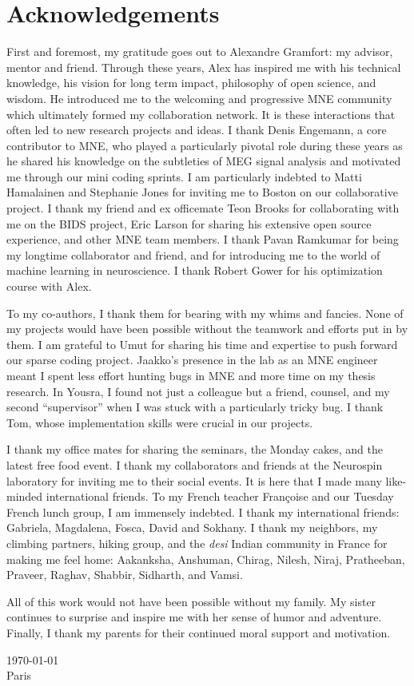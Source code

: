 \chapter*{Acknowledgements}
First and foremost, my gratitude goes out to Alexandre Gramfort: my advisor, mentor and friend. Through these years, Alex has inspired me with his technical knowledge, his vision for long term impact, philosophy of open science, and wisdom. He introduced me to the welcoming and progressive MNE community which ultimately formed my collaboration network. It is these interactions that often led to new research projects and ideas. I thank Denis Engemann, a core contributor to MNE, who played a particularly pivotal role during these years as he shared his knowledge on the subtleties of MEG signal analysis and motivated me through our mini coding sprints. I am particularly indebted to Matti Hamalainen and Stephanie Jones for inviting me to Boston on our collaborative project. I thank my friend and ex officemate Teon Brooks for collaborating with me on the BIDS project, Eric Larson for sharing his extensive open source experience, and other MNE team members. I thank Pavan Ramkumar for being my longtime collaborator and friend, and for introducing me to the world of machine learning in neuroscience. I thank Robert Gower for his optimization course with Alex.

To my co-authors, I thank them for bearing with my whims and fancies. None of my projects would have been possible without the teamwork and efforts put in by them. I am grateful to Umut for sharing his time and expertise to push forward our sparse coding project. Jaakko's presence in the lab as an MNE engineer meant I spent less effort hunting bugs in MNE and more time on my thesis research. In Yousra, I found not just a colleague but a friend, counsel, and my second ``supervisor'' when I was stuck with a particularly tricky bug. I thank Tom, whose implementation skills were crucial in our projects. 

I thank my office mates for sharing the seminars, the Monday cakes, and the latest free food event. I thank my collaborators and friends at the Neurospin laboratory for inviting me to their social events. It is here that I made many like-minded international friends. To my French teacher Françoise and our Tuesday French lunch group, I am immensely indebted. I thank my international friends: Gabriela, Magdalena, Fosca, David and Sokhany. I thank my neighbors, my climbing partners, hiking group, and the \textit{desi} Indian community in France for making me feel home: Aakanksha, Anshuman, Chirag, Nilesh, Niraj, Pratheeban, Praveer, Raghav, Shabbir, Sidharth, and Vamsi.

All of this work would not have been possible without my family. My sister continues to surprise and inspire me with her sense of humor and adventure. Finally, I thank my parents for their continued moral support and motivation.

\today \\
Paris
